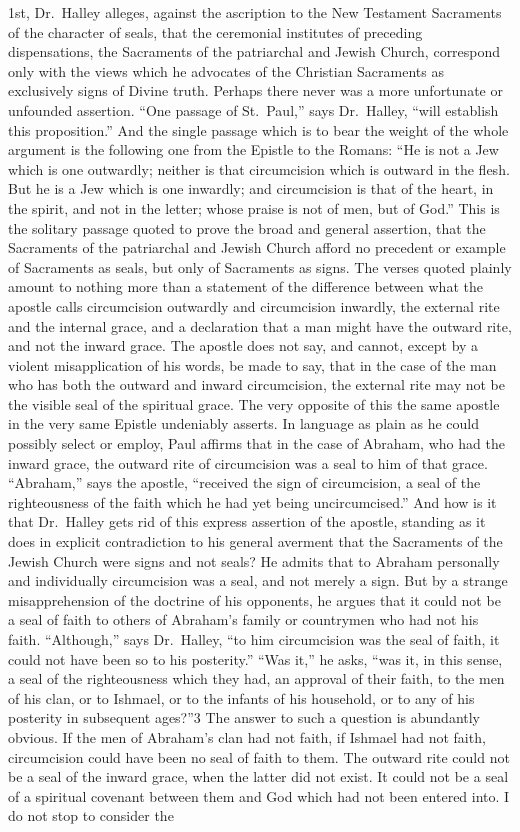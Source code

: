 \documentclass[]{book}
\begin{document}
1st, Dr.~Halley alleges, against the ascription to the New Testament Sacraments of the character of seals, that the ceremonial institutes of preceding dispensations, the Sacraments of the patriarchal and Jewish Church, correspond only with the views which he advocates of the Christian Sacraments as exclusively signs of Divine truth. Perhaps there never was a more unfortunate or unfounded assertion. ``One passage of St.~Paul,'' says Dr.~Halley, ``will establish this proposition.'' And the single passage which is to bear the weight of the whole argument is the following one from the Epistle to the Romans: ``He is not a Jew which is one outwardly; neither is that circumcision which is outward in the flesh. But he is a Jew which is one inwardly; and circumcision is that of the heart, in the spirit, and not in the letter; whose praise is not of men, but of God.'' This is the solitary passage quoted to prove the broad and general assertion, that the Sacraments of the patriarchal and Jewish Church afford no precedent or example of Sacraments as seals, but only of Sacraments as signs. The verses quoted plainly amount to nothing more than a statement of the difference between what the apostle calls circumcision outwardly and circumcision inwardly, the external rite and the internal grace, and a declaration that a man might have the outward rite, and not the inward grace. The apostle does not say, and cannot, except by a violent misapplication of his words, be made to say, that in the case of the man who has both the outward and inward circumcision, the external rite may not be the visible seal of the spiritual grace. The very opposite of this the same apostle in the very same Epistle undeniably asserts. In language as plain as he could possibly select or employ, Paul affirms that in the case of Abraham, who had the inward grace, the outward rite of circumcision was a seal to him of that grace. ``Abraham,'' says the apostle, ``received the sign of circumcision, a seal of the righteousness of the faith which he had yet being uncircumcised.'' And how is it that Dr.~Halley gets rid of this express assertion of the apostle, standing as it does in explicit contradiction to his general averment that the Sacraments of the Jewish Church were signs and not seals? He admits that to Abraham personally and individually circumcision was a seal, and not merely a sign. But by a strange misapprehension of the doctrine of his opponents, he argues that it could not be a seal of faith to others of Abraham's family or countrymen who had not his faith. ``Although,'' says Dr.~Halley, ``to him circumcision was the seal of faith, it could not have been so to his posterity.'' ``Was it,'' he asks, ``was it, in this sense, a seal of the righteousness which they had, an approval of their faith, to the men of his clan, or to Ishmael, or to the infants of his household, or to any of his posterity in subsequent ages?''3 The answer to such a question is abundantly obvious. If the men of Abraham's clan had not faith, if Ishmael had not faith, circumcision could have been no seal of faith to them. The outward rite could not be a seal of the inward grace, when the latter did not exist. It could not be a seal of a spiritual covenant between them and God which had not been entered into. I do not stop to consider the 
\end{document}
